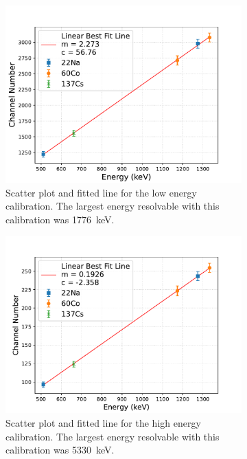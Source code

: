 \documentclass[11pt]{article}
\numberwithin{equation}{section}
\numberwithin{figure}{section}
\numberwithin{table}{section}
\begin{document}
\begin{figure}[h]%
    \centering
    \begin{subfigure}[t]{.49\linewidth}
        \centering
        \includegraphics[width=\linewidth]{Plots/low_calibration.pdf}
        \caption{Scatter plot and fitted line for the low energy calibration. The largest energy resolvable with this calibration was \SI{1776}{\kilo\electronvolt}.}
        \label{fig:low_calibration}
    \end{subfigure}
    \hfill
    \begin{subfigure}[t]{.49\linewidth}
        \centering
        \includegraphics[width=\linewidth]{Plots/high_calibration.pdf}
        \caption{Scatter plot and fitted line for the high energy calibration. The largest energy resolvable with this calibration was \SI{5330}{\kilo\electronvolt}.}
        \label{fig:high_calibration}
    \end{subfigure}
\caption{}
\label{fig:calibration}
\end{figure}
\end{document}
